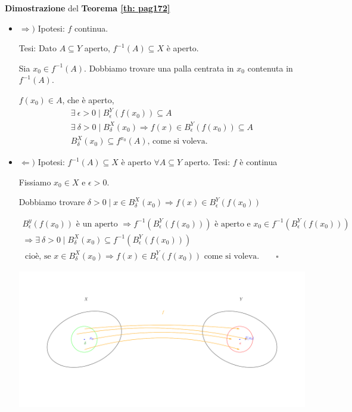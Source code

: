 \begin{dembar}
\textbf{Dimostrazione} del \textbf{Teorema \ref{th: pag172}}

	
	\begin{itemize}
		\item $\Rightarrow)$ Ipotesi: $f$ continua.
		
		Tesi: Dato $A \subseteq Y$ aperto, $f^{-1}(A)\subseteq X$ è aperto.
		
		Sia $x_0 \in f^{-1}(A)$. Dobbiamo trovare una palla centrata in $x_0$ contenuta in $f^{-1}(A)$.
		
		$f(x_0) \in A$, che è aperto, 
		\begin{gather*}
			\exists \ \epsilon >0 \; \big| \; B_{\epsilon}^{Y} (f(x_0)) \subseteq A
			\\
			\exists \ \delta > 0 \; \big| \; B_{\delta}^{X} (x_0) \Rightarrow f(x) \in B_{\epsilon}^{Y} (f(x_0)) \subseteq A
			\\
			B_{\delta}^{X}(x_0) \subseteq f^{x_0} (A) \text{, come si voleva.}
		\end{gather*}
		\item $\Leftarrow)$ Ipotesi: $f^{-1}(A) \subseteq X$ è aperto $\forall A \subseteq Y$ aperto. Tesi: $f$ è continua
		
		Fissiamo $x_0 \in X$ e $\epsilon > 0$.
		
		Dobbiamo trovare $\delta > 0 \; \big| \; x \in B_{\delta}^{X} (x_0) \Rightarrow f(x) \in B_{\epsilon}^{Y} (f(x_0))$
		
		\begin{gather*}
			B_{\epsilon}^{y} (f(x_0)) \text{ è un aperto } \Rightarrow f^{-1}(B_{\epsilon}^{Y} (f(x_0))) \text{ è aperto e } x_0 \in f^{-1} (B_{\epsilon}^{Y} (f(x_0))) 
			\\
			\Rightarrow \exists \ \delta > 0 \; \big| \; B_{\delta}^{X} (x_0) \subseteq f^{-1} (B_{\epsilon}^{Y}(f(x_0))) 
			\\
			\text{ cioè, se } x \in B_{\delta}^{X}(x_0) \Rightarrow f(x) \in B_{\epsilon}^{Y} (f(x_0)) \text{ come si voleva.} \qquad \square
		\end{gather*}
		
	\begin{center}
		\includegraphics[width=0.7\linewidth]{spazi_metrici_e_normati/pag174}
		\label{fig:pag174}
	\end{center}
	\end{itemize}
\end{dembar}


